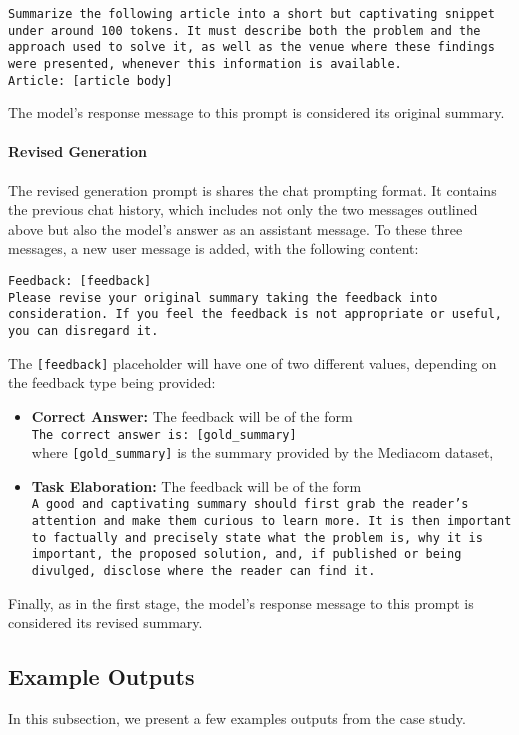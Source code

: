 \texttt{Summarize the following article into a short but captivating snippet under around 100 tokens. It must describe both the problem and the approach used to solve it, as well as the venue where these findings were presented, whenever this information is available. \\
Article: [article body]}

The model's response message to this prompt is considered its original summary.

\paragraph{Revised Generation} The revised generation prompt is shares the chat prompting format. It contains the previous chat history, which includes not only the two messages outlined above but also the model's answer as an assistant message. To these three messages, a new user message is added, with the following content:

\texttt{Feedback: [feedback] \\
Please revise your original summary taking the feedback into consideration. If you feel the feedback is not appropriate or useful, you can disregard it.}

The \texttt{[feedback]} placeholder will have one of two different values, depending on the feedback type being provided:
\begin{itemize}
    \item \textbf{Correct Answer:} The feedback will be of the form \\
    \texttt{The correct answer is: [gold\_summary]} \\
    where \texttt{[gold\_summary]} is the summary provided by the Mediacom dataset,
    
    \item \textbf{Task Elaboration:} The feedback will be of the form \\
    \texttt{A good and captivating summary should first grab the reader's attention and make them curious to learn more. It is then important to factually and precisely state what the problem is, why it is important, the proposed solution, and, if published or being divulged, disclose where the reader can find it.}
\end{itemize}

Finally, as in the first stage, the model's response message to this prompt is considered its revised summary.

\subsection{Example Outputs}
In this subsection, we present a few examples outputs from the case study.

